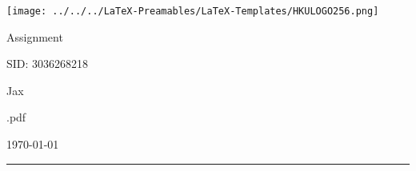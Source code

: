 \begin{minipage}{0.07\textwidth}
    \texttt{[image: ../../../LaTeX-Preamables/LaTeX-Templates/HKULOGO256.png]}
\end{minipage}
\hspace{0.02\textwidth}
\begin{minipage}{0.55\textwidth}
    \documentcourse

    Assignment \documentnumber

    SID: 3036268218
\end{minipage}
\begin{minipage}{0.35\textwidth}
    \begin{flushright}
        Jax

        \jobname.pdf

        \today
    \end{flushright}
\end{minipage}

\vspace{0.5cm}

\hrule